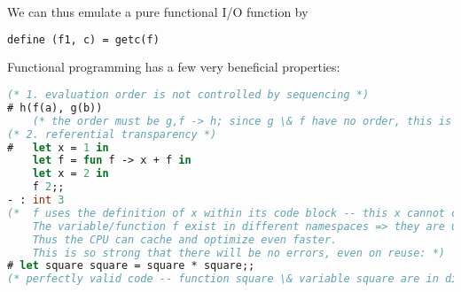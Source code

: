\documentclass[../../lecture_notes.tex]{subfiles}
\begin{document}
	\indent \indent We can thus emulate a pure functional I/O function by \begin{lstlisting}[language=ML]
	define (f1, c) = getc(f) \end{lstlisting}
Functional programming has a few very beneficial properties: \begin{lstlisting}[language=ML]
(* 1. evaluation order is not controlled by sequencing *)
# h(f(a), g(b))
	(* the order must be g,f -> h; since g \& f have no order, this is partial order *)
(* 2. referential transparency *)
# 	let x = 1 in
	let f = fun f -> x + f in 
	let x = 2 in
	f 2;;
- : int 3
(* 	f uses the definition of x within its code block -- this x cannot change value.
	The variable/function f exist in different namespaces => they are unambiguous.
	Thus the CPU can cache and optimize even faster.
	This is so strong that there will be no errors, even on reuse: *)
# let square square = square * square;;
(* perfectly valid code -- function square \& variable square are in different namespaces *)
\end{lstlisting}
\end{document}
